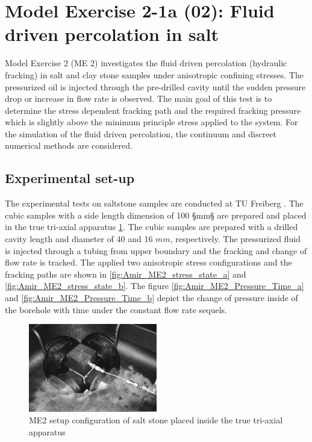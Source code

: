 \section{Model Exercise 2-1a (02): Fluid driven percolation in salt}
\label{sec:mex02}
Model Exercise 2 (ME 2) investigates the fluid driven percolation (hydraulic fracking) in salt and clay stone samples under anisotropic confining stresses. The pressurized oil is injected through the pre-drilled cavity until the sudden pressure drop or increase in flow rate is observed. The main goal of this test is to determine the stress dependent fracking path and the required fracking pressure which is slightly above the minimum principle stress applied to the system. For the simulation of the fluid driven percolation, the continuum and discreet numerical methods are considered.
\subsection{Experimental set-up}
The experimental tests on saltstone samples are conducted at TU Freiberg \cite{Kamlot2009}. The cubic samples with a side length dimension of 100 §mm§ are prepared and placed in the true tri-axial apparatus \ref{fig:Amir_ME2_Saltstone_Setup}. The cubic samples are prepared with a drilled cavity length and diameter of 40 and 16 $mm$, respectively. The pressurized fluid is injected through a tubing from upper boundary and the fracking and change of flow rate is tracked. The applied two anisotropic stress configurations and the fracking paths are shown in \ref{fig:Amir_ME2_stress_state_a} and \ref{fig:Amir_ME2_stress_state_b}. The figure \ref{fig:Amir_ME2_Pressure_Time_a} and \ref{fig:Amir_ME2_Pressure_Time_b} depict the change of pressure inside of the borehole with time under the constant flow rate sequels.

\begin{figure}[!ht]
\centering
\includegraphics[width=0.5\textwidth]{figures/Amir_ME2_Saltstone_Setup.png}
\caption{ME2 setup configuration of salt stone placed inside the true tri-axial apparatus \cite{Kamlot2009}}
\label{fig:Amir_ME2_Saltstone_Setup}
\end{figure}


